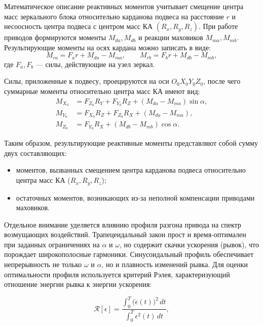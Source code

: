 Математическое описание реактивных моментов учитывает смещение центра масс зеркального блока относительно карданова подвеса на расстояние $r$ и несоосность центра подвеса с центром масс КА $(R_x,R_y,R_z)$. При работе приводов формируются моменты $M_{da}, M_{db}$ и реакции маховиков $M_{ma}, M_{mb}$. Результирующие моменты на осях кардана можно записать в виде:
\begin{equation}
	M_{ra} = F_a r + M_{da} - M_{ma}, 
	\qquad 
	M_{rb} = F_b r + M_{db} - M_{mb},
\end{equation}
где $F_a, F_b$ --- силы, действующие на узел зеркал. 

Силы, приложенные к подвесу, проецируются на оси $O_0X_0Y_0Z_0$, после чего суммарные моменты относительно центра масс КА имеют вид:
\begin{equation}
	\begin{aligned}
		M_{X_0} &= F_{Z_0}R_Y + F_{Y_0}R_Z + (M_{da}-M_{ma})\sin\alpha, \\
		M_{Y_0} &= F_{X_0}R_Z + F_{Z_0}R_X + (M_{da}-M_{ma}), \\
		M_{Z_0} &= F_{Y_0}R_X + (M_{db}-M_{mb})\cos\alpha.
	\end{aligned}
\end{equation}

Таким образом, результирующие реактивные моменты представляют собой сумму двух составляющих: 
\begin{itemize}
	\item моментов, вызванных смещением центра карданова подвеса относительно центра масс КА ($R_x, R_y, R_z$);
	\item остаточных моментов, возникающих из-за неполной компенсации приводами маховиков.
\end{itemize}


Отдельное внимание уделяется влиянию профиля разгона привода на спектр возмущающих воздействий. Трапецеидальный закон прост и время-оптимален при заданных ограничениях на $\alpha$ и $\omega$, но содержит скачки ускорения (рывок), что порождает широкополосные гармоники. Синусоидальный профиль обеспечивает непрерывность не только $\omega$ и $\alpha$, но и плавность изменений рывка. 
Для оценки оптимальности профиля используется критерий Рэлея, характеризующий отношение энергии рывка к энергии ускорения:

\begin{equation}
	\label{eq:relay}
	\mathcal{R}[\epsilon] =
	\frac{\displaystyle \int_{0}^{T} \bigl(\dot{\epsilon}(t)\bigr)^{2}\,dt}
	{\displaystyle \int_{0}^{T} \epsilon^{2}(t)\,dt},
\end{equation}

